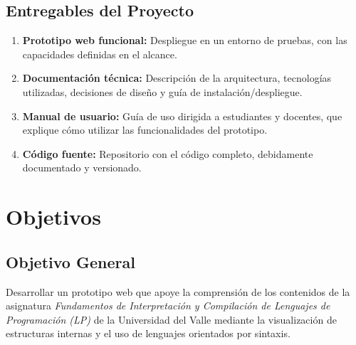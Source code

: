 \subsection{Entregables del Proyecto}
\begin{enumerate}
    \item \textbf{Prototipo web funcional:} Despliegue en un entorno de pruebas, con las capacidades definidas en el alcance.

    \item \textbf{Documentación técnica:} Descripción de la arquitectura, tecnologías utilizadas, decisiones de diseño y guía de instalación/despliegue.

    \item \textbf{Manual de usuario:} Guía de uso dirigida a estudiantes y docentes, que explique cómo utilizar las funcionalidades del prototipo.

    \item \textbf{Código fuente:} Repositorio con el código completo, debidamente documentado y versionado.
\end{enumerate}


\section{Objetivos}

\subsection{Objetivo General}
Desarrollar un prototipo web que apoye la comprensión de los contenidos de la asignatura \textit{Fundamentos de Interpretación y Compilación de Lenguajes de Programación (LP)} de la Universidad del Valle mediante la visualización de estructuras internas y el uso de lenguajes orientados por sintaxis.

